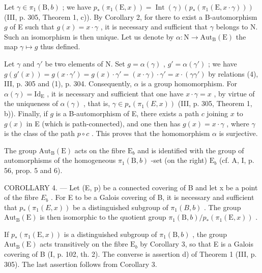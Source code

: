 Let \(\gamma \in \pi_1(\mathrm{B}, b)\) ; we have \(p_*(\pi_1(\mathrm{E}, x)) = \operatorname{Int}(\gamma)(p_*(\pi_1(\mathrm{E}, x \cdot \gamma)))\) (III, p. 305, Theorem 1, c)). By Corollary 2, for there to exist a B-automorphism \(g\) of E such that \(g(x) = x \cdot \gamma\) , it is necessary and sufficient that \(\gamma\) belongs to N. Such an isomorphism is then unique. Let us denote by \(\alpha: \mathrm{N} \to \mathrm{Aut}_{\mathrm{B}}(\mathrm{E})\) the map \(\gamma \mapsto g\) thus defined.

Let \(\gamma\) and \(\gamma'\) be two elements of N. Set \(g = \alpha(\gamma)\) , \(g' = \alpha(\gamma')\) ; we have \(g(g'(x)) = g(x \cdot \gamma') = g(x) \cdot \gamma' = (x \cdot \gamma) \cdot \gamma' = x \cdot (\gamma\gamma')\) by relations (4), III, p. 305 and (1), p. 304. Consequently, \(\alpha\) is a group homomorphism. For \(\alpha(\gamma) = \mathrm{Id}_{\mathrm{E}}\) , it is necessary and sufficient that one have \(x \cdot \gamma = x\) , by virtue of the uniqueness of \(\alpha(\gamma)\) , that is, \(\gamma \in p_*(\pi_1(E, x))\) (III, p. 305, Theorem 1, b)). Finally, if \(g\) is a B-automorphism of E, there exists a path \(c\) joining \(x\) to \(g(x)\) in E (which is path-connected), and one then has \(g(x) = x \cdot \gamma\) , where \(\gamma\) is the class of the path \(p \circ c\) . This proves that the homomorphism \(\alpha\) is surjective.

The group \(\mathrm{Aut}_{\mathrm{B}}(\mathrm{E})\) acts on the fibre \(\mathrm{E}_b\) and is identified with the group of automorphisms of the homogeneous \(\pi_1(\mathrm{B},b)\) -set (on the right) \(\mathrm{E}_b\) (cf. A, I, p. 56, prop. 5 and 6).

COROLLARY 4. --- Let (E, p) be a connected covering of B and let x be a point of the fibre \(E_{b}\) . For E to be a Galois covering of B, it is necessary and sufficient that \(p_{*}(\pi_{1}(E, x))\) be a distinguished subgroup of \(\pi_{1}(B, b)\) . The group \(\mathrm{Aut}_{\mathrm{B}}(\mathrm{E})\) is then isomorphic to the quotient group \(\pi_{1}(\mathrm{B}, b)/p_{*}(\pi_{1}(\mathrm{E}, x))\) .

If \(p_{*}(\pi_{1}(\mathrm{E},x))\) is a distinguished subgroup of \(\pi_1(\mathrm{B},b)\) , the group \(\mathrm{Aut}_{\mathrm{B}}(\mathrm{E})\) acts transitively on the fibre \(\mathrm{E}_b\) by Corollary 3, so that E is a Galois covering of B (I, p. 102, th. 2). The converse is assertion d) of Theorem 1 (III, p. 305). The last assertion follows from Corollary 3.

